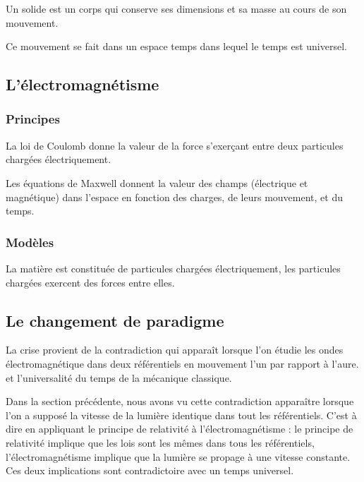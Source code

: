 Un solide est un corps qui conserve ses dimensions et sa masse au cours de son mouvement.

Ce mouvement se fait dans un espace temps dans lequel le temps est universel.


  \subsection{L'électromagnétisme}

  \subsubsection{Principes}

La loi de Coulomb donne la valeur de la force s'exerçant entre deux particules chargées électriquement.

Les équations de Maxwell donnent la valeur des champs (électrique et magnétique) dans l'espace en fonction des charges, de leurs mouvement, et du temps.

  \subsubsection{Modèles}

La matière est constituée de particules chargées électriquement, les particules chargées exercent des forces entre elles.


  \subsection{Le changement de paradigme}

La crise provient de la contradiction qui apparaît lorsque l'on étudie les ondes électromagnétique dans deux référentiels en mouvement l'un par rapport à l'aure. et l'universalité du temps de la mécanique classique.


Dans la section précédente, nous avons vu cette contradiction apparaître lorsque l'on a supposé la vitesse de la lumière identique dans tout les référentiels. C'est à dire en appliquant le principe de relativité à l'électromagnétisme : le principe de relativité implique que les lois sont les mêmes dans tous les référentiels, l'électromagnétisme implique que la lumière se propage à une vitesse constante. Ces deux implications sont contradictoire avec un temps universel.






